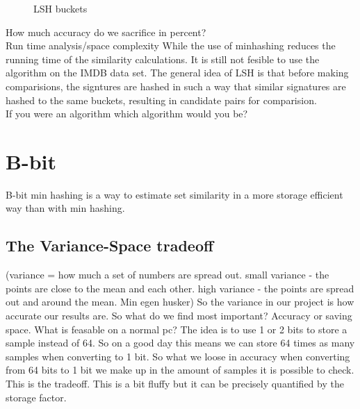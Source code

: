 \documentclass[a4paper,11pt]{article}
\begin{document}
\begin{figure}
\begin{center}
    \caption{LSH buckets}
    \label{fig:lsh_buckets}
    \end{center}
\end{figure}



How much accuracy do we sacrifice in percent?\\

Run time analysis/space complexity
While the use of minhashing reduces the running time of the similarity calculations. It is still not fesible to use the algorithm on the IMDB data set. The general idea of LSH is that before making comparisions, the signtures are hashed in such a way that similar signatures are hashed to the same buckets, resulting in candidate pairs for comparision.\\

If you were an algorithm which algorithm would you be?

\section{B-bit}
B-bit min hashing is a way to estimate set similarity in a more storage efficient way than with min hashing.
\subsection{The Variance-Space tradeoff}
(variance = how much a set of numbers are spread out. small variance - the points are close to the mean and each other. high variance - the points are spread out and around the mean. Min egen husker) So the variance in our project is how accurate our results are. So what do we find most important? Accuracy or saving space. What is feasable on a normal pc? The idea is to use 1 or 2 bits to store a sample instead of 64. So on a good day this means we can store 64 times as many samples when converting to 1 bit. So what we loose in accuracy when converting from 64 bits to 1 bit we make up in the amount of samples it is possible to check. This is the tradeoff. This is a bit fluffy but it can be precisely quantified by the storage factor. 
\end{document}
